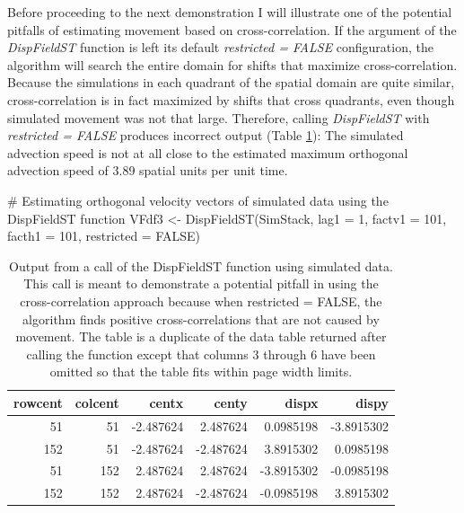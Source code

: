 Before proceeding to the next demonstration I will illustrate one of the
potential pitfalls of estimating movement based on cross-correlation. If
the argument of the \emph{DispFieldST} function is left its default
\emph{restricted = FALSE} configuration, the algorithm will search the
entire domain for shifts that maximize cross-correlation. Because the
simulations in each quadrant of the spatial domain are quite similar,
cross-correlation is in fact maximized by shifts that cross quadrants,
even though simulated movement was not that large. Therefore, calling
\emph{DispFieldST} with \emph{restricted = FALSE} produces incorrect
output (Table \ref{tab:Pitfall-demo-tex}): The simulated advection speed
is not at all close to the estimated maximum orthogonal advection speed
of 3.89 spatial units per unit time.

\begin{Schunk}
\begin{Sinput}
# Estimating orthogonal velocity vectors of simulated data using the DispFieldST function
VFdf3 <- DispFieldST(SimStack, lag1 = 1, factv1 = 101, facth1 = 101, restricted = FALSE)
\end{Sinput}
\end{Schunk}

\begin{Schunk}
\begin{table}

\caption{\label{tab:Pitfall-demo-tex}Output from a call of the DispFieldST function using simulated data. This call is meant to demonstrate a potential pitfall in using the cross-correlation approach because when restricted = FALSE, the algorithm finds positive cross-correlations that are not caused by movement. The table is a duplicate of the data table returned after calling the function except that columns 3 through 6 have been omitted so that the table fits within page width limits.}
\centering
\begin{tabular}[t]{r|r|r|r|r|r}
\hline
rowcent & colcent & centx & centy & dispx & dispy\\
\hline
51 & 51 & -2.487624 & 2.487624 & 0.0985198 & -3.8915302\\
\hline
152 & 51 & -2.487624 & -2.487624 & 3.8915302 & 0.0985198\\
\hline
51 & 152 & 2.487624 & 2.487624 & -3.8915302 & -0.0985198\\
\hline
152 & 152 & 2.487624 & -2.487624 & -0.0985198 & 3.8915302\\
\hline
\end{tabular}
\end{table}

\end{Schunk}

